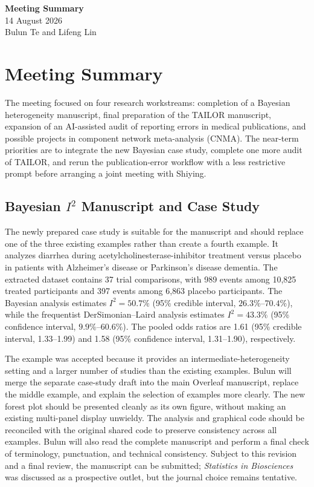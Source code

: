 \documentclass[11pt]{article}
\begin{document}
\begin{center}
    {\Large \textbf{Meeting Summary}}\\[0.4em]
    {\large 14 August 2026}\\[0.4em]
    Bulun Te and Lifeng Lin
\end{center}

\section*{Meeting Summary}

The meeting focused on four research workstreams: completion of a Bayesian heterogeneity manuscript, final preparation of the TAILOR manuscript, expansion of an AI-assisted audit of reporting errors in medical publications, and possible projects in component network meta-analysis (CNMA). The near-term priorities are to integrate the new Bayesian case study, complete one more audit of TAILOR, and rerun the publication-error workflow with a less restrictive prompt before arranging a joint meeting with Shiying.

\subsection*{Bayesian $I^2$ Manuscript and Case Study}

The newly prepared case study is suitable for the manuscript and should replace one of the three existing examples rather than create a fourth example. It analyzes diarrhea during acetylcholinesterase-inhibitor treatment versus placebo in patients with Alzheimer's disease or Parkinson's disease dementia. The extracted dataset contains 37 trial comparisons, with 989 events among 10,825 treated participants and 397 events among 6,863 placebo participants. The Bayesian analysis estimates $I^2=50.7\%$ (95\% credible interval, $26.3\%$--$70.4\%$), while the frequentist DerSimonian--Laird analysis estimates $I^2=43.3\%$ (95\% confidence interval, $9.9\%$--$60.6\%$). The pooled odds ratios are 1.61 (95\% credible interval, 1.33--1.99) and 1.58 (95\% confidence interval, 1.31--1.90), respectively.

The example was accepted because it provides an intermediate-heterogeneity setting and a larger number of studies than the existing examples. Bulun will merge the separate case-study draft into the main Overleaf manuscript, replace the middle example, and explain the selection of examples more clearly. The new forest plot should be presented cleanly as its own figure, without making an existing multi-panel display unwieldy. The analysis and graphical code should be reconciled with the original shared code to preserve consistency across all examples. Bulun will also read the complete manuscript and perform a final check of terminology, punctuation, and technical consistency. Subject to this revision and a final review, the manuscript can be submitted; \emph{Statistics in Biosciences} was discussed as a prospective outlet, but the journal choice remains tentative.
\end{document}

